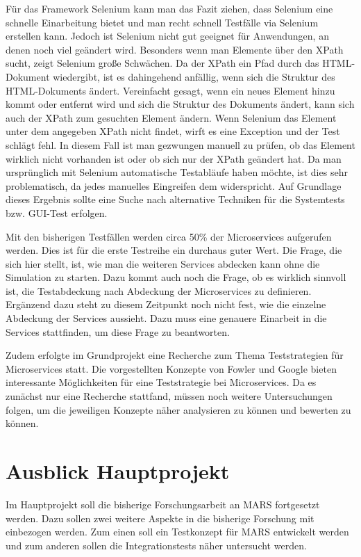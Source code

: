 \documentclass{llncs}
\begin{document}
Für das Framework Selenium kann man das Fazit ziehen, dass Selenium eine schnelle Einarbeitung bietet und man recht schnell Testfälle via Selenium erstellen kann. Jedoch ist Selenium nicht gut geeignet für Anwendungen, an denen noch viel geändert wird. Besonders wenn man Elemente über den XPath sucht, zeigt Selenium große Schwächen. Da der XPath ein Pfad durch das HTML-Dokument wiedergibt, ist es dahingehend anfällig, wenn sich die Struktur des HTML-Dokuments ändert. Vereinfacht gesagt, wenn ein neues Element hinzu kommt oder entfernt wird und sich die Struktur des Dokuments ändert, kann sich auch der XPath zum gesuchten Element ändern. Wenn Selenium das Element unter dem angegeben XPath nicht findet, wirft es eine Exception und der Test schlägt fehl. In diesem Fall ist man gezwungen manuell zu prüfen, ob das Element wirklich nicht vorhanden ist oder ob sich nur der XPath geändert hat. Da man ursprünglich mit Selenium automatische Testabläufe haben möchte, ist dies sehr problematisch, da jedes manuelles Eingreifen dem widerspricht. Auf Grundlage dieses Ergebnis sollte eine Suche nach alternative Techniken für die Systemtests bzw. GUI-Test erfolgen.

Mit den bisherigen Testfällen werden circa 50\% der Microservices aufgerufen werden. Dies ist für die erste Testreihe ein durchaus guter Wert. Die Frage, die sich hier stellt, ist, wie man die weiteren Services abdecken kann ohne die Simulation zu starten. Dazu kommt auch noch die Frage, ob es wirklich sinnvoll ist, die Testabdeckung nach Abdeckung der Microservices zu definieren. Ergänzend dazu steht zu diesem Zeitpunkt noch nicht fest, wie die einzelne Abdeckung der Services aussieht. Dazu muss eine genauere Einarbeit in die Services stattfinden, um diese Frage zu beantworten.

Zudem erfolgte im Grundprojekt eine Recherche zum Thema Teststrategien für Microservices statt. Die vorgestellten Konzepte von Fowler und Google bieten interessante Möglichkeiten für eine Teststrategie bei Microservices. Da es zunächst nur eine Recherche stattfand, müssen noch weitere Untersuchungen folgen, um die jeweiligen Konzepte näher analysieren zu können und bewerten zu können. 

\section{Ausblick Hauptprojekt}
Im Hauptprojekt soll die bisherige Forschungsarbeit an MARS fortgesetzt werden. Dazu sollen zwei weitere Aspekte in die bisherige Forschung mit einbezogen werden. Zum einen soll ein Testkonzept für MARS entwickelt werden und zum anderen sollen die Integrationstests näher untersucht werden.
\end{document}
